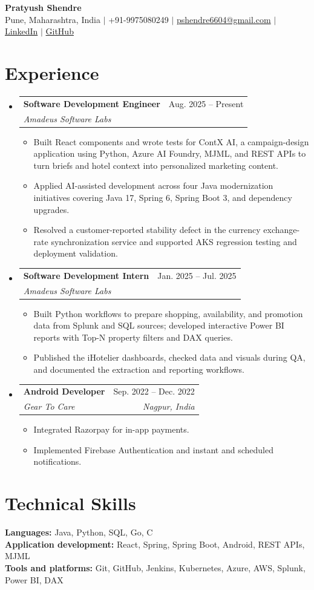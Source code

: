 \documentclass[a4paper,11pt]{article}
\makeatletter
\newcommand{\entry}[4]{\item\begin{tabularx}{\textwidth}{@{}Xr@{}}\textbf{#1}& #2\\\textit{\small #3}&\textit{\small #4}\end{tabularx}\vspace{-5pt}}
\newcommand{\bulletpoint}[1]{\item\small{#1}}
\makeatother
\begin{document}
\begin{center}
  {\Large\bfseries Pratyush Shendre}\\[2pt]
  \small Pune, Maharashtra, India $|$ +91-9975080249 $|$
  \href{mailto:pshendre6604@gmail.com}{pshendre6604@gmail.com} $|$
  \href{https://linkedin.com/in/pratyush-shendre-2256a7223/}{LinkedIn} $|$
  \href{https://github.com/PratyushS04}{GitHub}
\end{center}

\section{Experience}
\begin{itemize}[leftmargin=0in,label={}]
  \entry{Software Development Engineer}{Aug. 2025 -- Present}{Amadeus Software Labs}{}
  \begin{itemize}
    \bulletpoint{Built React components and wrote tests for ContX AI, a campaign-design application using Python, Azure AI Foundry, MJML, and REST APIs to turn briefs and hotel context into personalized marketing content.}
    \bulletpoint{Applied AI-assisted development across four Java modernization initiatives covering Java 17, Spring 6, Spring Boot 3, and dependency upgrades.}
    \bulletpoint{Resolved a customer-reported stability defect in the currency exchange-rate synchronization service and supported AKS regression testing and deployment validation.}
  \end{itemize}
  \entry{Software Development Intern}{Jan. 2025 -- Jul. 2025}{Amadeus Software Labs}{}
  \begin{itemize}
    \bulletpoint{Built Python workf{}lows to prepare shopping, availability, and promotion data from Splunk and SQL sources; developed interactive Power BI reports with Top-N property f{}ilters and DAX queries.}
    \bulletpoint{Published the iHotelier dashboards, checked data and visuals during QA, and documented the extraction and reporting workf{}lows.}
  \end{itemize}
  \entry{Android Developer}{Sep. 2022 -- Dec. 2022}{Gear To Care}{Nagpur, India}
  \begin{itemize}
    \bulletpoint{Integrated Razorpay for in-app payments.}
    \bulletpoint{Implemented Firebase Authentication and instant and scheduled notif{}ications.}
  \end{itemize}
\end{itemize}

\section{Technical Skills}
\small\textbf{Languages:} Java, Python, SQL, Go, C \\
\textbf{Application development:} React, Spring, Spring Boot, Android, REST APIs, MJML \\
\textbf{Tools and platforms:} Git, GitHub, Jenkins, Kubernetes, Azure, AWS, Splunk, Power BI, DAX
\end{document}
